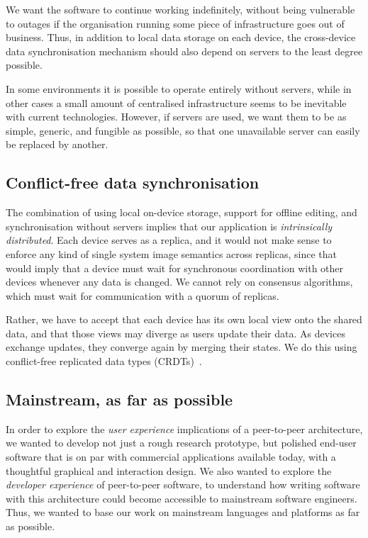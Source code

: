 \documentclass[sigplan,10pt]{acmart}
\begin{document}
We want the software to continue working indefinitely, without being vulnerable to outages if the organisation running some piece of infrastructure goes out of business.
Thus, in addition to local data storage on each device, the cross-device data synchronisation mechanism should also depend on servers to the least degree possible.

In some environments it is possible to operate entirely without servers, while in other cases a small amount of centralised infrastructure seems to be inevitable with current technologies.
However, if servers are used, we want them to be as simple, generic, and fungible as possible, so that one unavailable server can easily be replaced by another.

\subsection{Conflict-free data synchronisation}

The combination of using local on-device storage, support for offline editing, and synchronisation without servers implies that our application is \emph{intrinsically distributed}.
Each device serves as a replica, and it would not make sense to enforce any kind of single system image semantics across replicas, since that would imply that a device must wait for synchronous coordination with other devices whenever any data is changed.
We cannot rely on consensus algorithms, which must wait for communication with a quorum of replicas.

Rather, we have to accept that each device has its own local view onto the shared data, and that those views may diverge as users update their data.
As devices exchange updates, they converge again by merging their states.
We do this using conflict-free replicated data types (CRDTs)~\cite{Shapiro:2011un}.

\subsection{Mainstream, as far as possible}

In order to explore the \emph{user experience} implications of a peer-to-peer architecture, we wanted to develop not just a rough research prototype, but polished end-user software that is on par with commercial applications available today, with a thoughtful graphical and interaction design.
We also wanted to explore the \emph{developer experience} of peer-to-peer software, to understand how writing software with this architecture could become accessible to mainstream software engineers.
Thus, we wanted to base our work on mainstream languages and platforms as far as possible.
\end{document}

